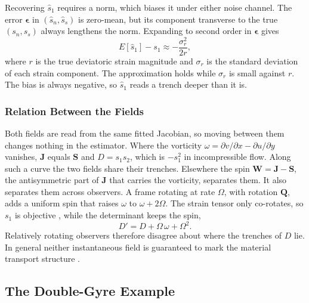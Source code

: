 \documentclass[lettersize,journal]{IEEEtran}
\begin{document}
Recovering $\hat{s}_1$ requires a norm, which biases it under either
noise channel. The error $\boldsymbol{\epsilon}$ in
$(\hat{s}_n, \hat{s}_s)$ is zero-mean, but its component transverse to
the true $(s_n, s_s)$ always lengthens the norm. Expanding to second
order in $\boldsymbol{\epsilon}$ gives
\begin{equation}
    E[\hat{s}_1] - s_1 \approx -\frac{\sigma_r^2}{2r},
    \label{eq:s1_bias}
\end{equation}
where $r$ is the true deviatoric strain magnitude and $\sigma_r$ is the
standard deviation of each strain component. The approximation holds
while $\sigma_r$ is small against $r$. The bias is always negative, so
$\hat{s}_1$ reads a trench deeper than it is.

\subsubsection{Relation Between the Fields}
Both fields are read from the same fitted Jacobian, so moving between
them changes nothing in the estimator. Where the vorticity
$\omega = \partial v/\partial x - \partial u/\partial y$ vanishes,
$\mathbf{J}$ equals $\mathbf{S}$ and $D = s_1 s_2$, which is $-s_1^2$ in
incompressible flow. Along such a curve the two fields share their
trenches. Elsewhere the spin $\mathbf{W} = \mathbf{J} - \mathbf{S}$, the
antisymmetric part of $\mathbf{J}$ that carries the vorticity, separates
them. It also separates them across observers. A frame rotating at rate
$\Omega$, with rotation $\mathbf{Q}$, adds a uniform spin that raises
$\omega$ to $\omega + 2\Omega$. The strain tensor only co-rotates, so
$s_1$ is objective \cite{17}, while the determinant keeps the spin,
\begin{equation}
    D' = D + \Omega\,\omega + \Omega^2 .
    \label{eq:D_not_objective}
\end{equation}
Relatively rotating observers therefore disagree about where the
trenches of $D$ lie. In general neither instantaneous field is
guaranteed to mark the material transport structure \cite{16}.

\subsection{The Double-Gyre Example}
\label{sec:dg_example}
\end{document}
